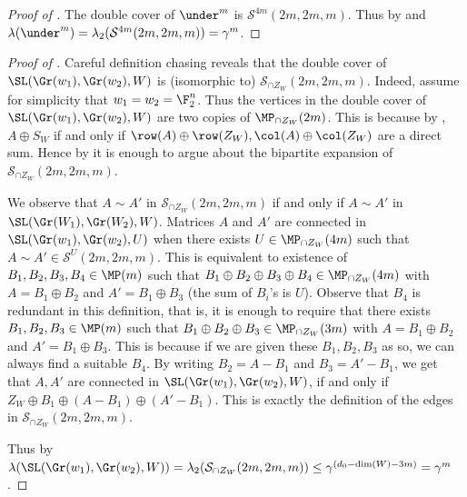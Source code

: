 \begin{proof}[Proof of ]
    The double cover of \(\under^m\) is \(\mathcal{S}^{4m}(2m,2m,m)\). Thus by  and  \(\lambda(\under^m) = \lambda_2(\mathcal{S}^{4m}(2m,2m,m)) = \gamma^{ m}\).
\end{proof}

\begin{proof}[Proof of ]
    Careful definition chasing reveals that the double cover of \(\SL(\Gr(w_1),\Gr(w_2),W)\) is (isomorphic to) \(\mathcal{S}_{\cap Z_W}(2m,2m,m)\). Indeed, assume for simplicity that \(w_1 = w_2 = \F_2^n\). Thus the vertices in the double cover of \(\SL(\Gr(w_1),\Gr(w_2),W)\) are two copies of \(\MP_{\cap Z_W}(2m)\). This is because by , \(A \oplus S_W\) if and only if \(\row(A) \oplus \row(Z_W), \col(A) \oplus \col(Z_W)\) are a direct sum. Hence by  it is enough to argue about the bipartite expansion of \(\mathcal{S}_{\cap Z_W}(2m,2m,m)\).
    
    We observe that \(A \sim A'\) in \(\mathcal{S}_{\cap Z_W}(2m,2m,m)\) if and only if \(A \sim A'\) in \(\SL(\Gr(W_1),\Gr(W_2),W)\). Matrices \(A\) and \(A'\) are connected in \(\SL(\Gr(w_1),\Gr(w_2),U)\) when there exists \(U \in \MP_{\cap Z_W}(4m)\) such that \(A \sim A' \in \mathcal{S}^U(2m,2m,m)\). This is equivalent to existence of \(B_1,B_2,B_3,B_4 \in \MP(m)\) such that \(B_1 \oplus B_2 \oplus B_3 \oplus B_4 \in \MP_{\cap Z_W}(4m)\) with \(A = B_1 \oplus B_2\) and \(A' = B_1 \oplus B_3\) (the sum of \(B_i\)'s is \(U\)). Observe that \(B_4\) is redundant in this definition, that is, it is enough to require that there exists \(B_1,B_2,B_3 \in \MP(m)\) such that \(B_1 \oplus B_2 \oplus B_3 \in \MP_{\cap Z_W}(3m)\) with \(A = B_1 \oplus B_2\) and \(A' = B_1 \oplus B_3\). This is because if we are given these \(B_1,B_2,B_3\) as so, we can always find a suitable \(B_4\). By writing \(B_2 = A-B_1\) and \(B_3 = A'-B_1\), we get that \(A,A'\) are connected in \(\SL(\Gr(w_1),\Gr(w_2),W)\), if and only if \(Z_W \oplus B_1 \oplus (A-B_1) \oplus (A'-B_1)\). This is exactly the definition of the edges in \(\mathcal{S}_{\cap Z_W}(2m,2m,m)\).

   Thus by  \(\lambda(\SL(\Gr(w_1),\Gr(w_2),W)) = \lambda_2(\mathcal{S}_{\cap Z_W}(2m,2m,m))\leq \gamma^{(d_0-\dim(W)-3m)} = \gamma^{m}\).    
\end{proof}

